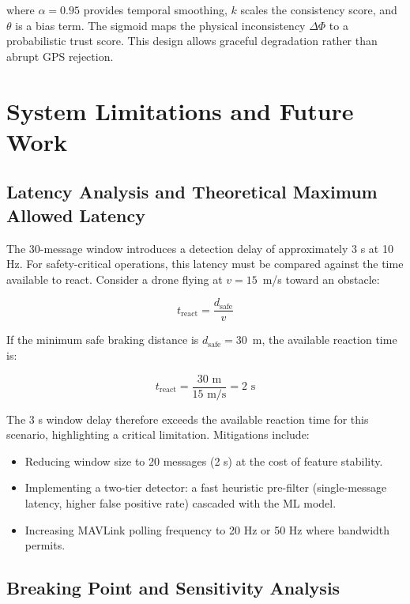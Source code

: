\documentclass[11pt,a4paper]{article}
\begin{document}
where $\alpha = 0.95$ provides temporal smoothing, $k$ scales the consistency score, and $\theta$ is a bias term. The sigmoid maps the physical inconsistency $\Delta \Phi$ to a probabilistic trust score. This design allows graceful degradation rather than abrupt GPS rejection.

\section{System Limitations and Future Work}

\subsection{Latency Analysis and Theoretical Maximum Allowed Latency}

The 30-message window introduces a detection delay of approximately 3 s at 10 Hz. For safety-critical operations, this latency must be compared against the time available to react. Consider a drone flying at $v = 15$~m/s toward an obstacle:

\begin{equation}
    t_{\text{react}} = \frac{d_{\text{safe}}}{v}
\end{equation}

If the minimum safe braking distance is $d_{\text{safe}} = 30$~m, the available reaction time is:

\begin{equation}
    t_{\text{react}} = \frac{30 \text{ m}}{15 \text{ m/s}} = 2 \text{ s}
\end{equation}

The 3 s window delay therefore exceeds the available reaction time for this scenario, highlighting a critical limitation. Mitigations include:
\begin{itemize}
    \item Reducing window size to 20 messages (2 s) at the cost of feature stability.
    \item Implementing a two-tier detector: a fast heuristic pre-filter (single-message latency, higher false positive rate) cascaded with the ML model.
    \item Increasing MAVLink polling frequency to 20 Hz or 50 Hz where bandwidth permits.
\end{itemize}

\subsection{Breaking Point and Sensitivity Analysis}
\end{document}
